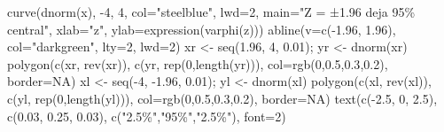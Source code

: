 \documentclass[
  letterpaper,
  DIV=11,
  numbers=noendperiod]{scrartcl}
\newenvironment{Shaded}{\begin{snugshade}}{\end{snugshade}}
\newcommand{\AttributeTok}[1]{\textcolor[rgb]{0.40,0.45,0.13}{#1}}
\newcommand{\ConstantTok}[1]{\textcolor[rgb]{0.56,0.35,0.01}{#1}}
\newcommand{\DecValTok}[1]{\textcolor[rgb]{0.68,0.00,0.00}{#1}}
\newcommand{\FloatTok}[1]{\textcolor[rgb]{0.68,0.00,0.00}{#1}}
\newcommand{\FunctionTok}[1]{\textcolor[rgb]{0.28,0.35,0.67}{#1}}
\newcommand{\NormalTok}[1]{\textcolor[rgb]{0.00,0.23,0.31}{#1}}
\newcommand{\OtherTok}[1]{\textcolor[rgb]{0.00,0.23,0.31}{#1}}
\newcommand{\SpecialCharTok}[1]{\textcolor[rgb]{0.37,0.37,0.37}{#1}}
\newcommand{\StringTok}[1]{\textcolor[rgb]{0.13,0.47,0.30}{#1}}
\begin{document}
\begin{Shaded}
\begin{Highlighting}[]
\FunctionTok{curve}\NormalTok{(}\FunctionTok{dnorm}\NormalTok{(x), }\SpecialCharTok{{-}}\DecValTok{4}\NormalTok{, }\DecValTok{4}\NormalTok{, }\AttributeTok{col=}\StringTok{"steelblue"}\NormalTok{, }\AttributeTok{lwd=}\DecValTok{2}\NormalTok{,}
      \AttributeTok{main=}\StringTok{"Z = ±1.96 deja 95\% central"}\NormalTok{,}
      \AttributeTok{xlab=}\StringTok{"z"}\NormalTok{, }\AttributeTok{ylab=}\FunctionTok{expression}\NormalTok{(}\FunctionTok{varphi}\NormalTok{(z)))}
\FunctionTok{abline}\NormalTok{(}\AttributeTok{v=}\FunctionTok{c}\NormalTok{(}\SpecialCharTok{{-}}\FloatTok{1.96}\NormalTok{, }\FloatTok{1.96}\NormalTok{), }\AttributeTok{col=}\StringTok{"darkgreen"}\NormalTok{, }\AttributeTok{lty=}\DecValTok{2}\NormalTok{, }\AttributeTok{lwd=}\DecValTok{2}\NormalTok{)}
\NormalTok{xr }\OtherTok{\textless{}{-}} \FunctionTok{seq}\NormalTok{(}\FloatTok{1.96}\NormalTok{, }\DecValTok{4}\NormalTok{, }\FloatTok{0.01}\NormalTok{); yr }\OtherTok{\textless{}{-}} \FunctionTok{dnorm}\NormalTok{(xr)}
\FunctionTok{polygon}\NormalTok{(}\FunctionTok{c}\NormalTok{(xr, }\FunctionTok{rev}\NormalTok{(xr)), }\FunctionTok{c}\NormalTok{(yr, }\FunctionTok{rep}\NormalTok{(}\DecValTok{0}\NormalTok{,}\FunctionTok{length}\NormalTok{(yr))), }\AttributeTok{col=}\FunctionTok{rgb}\NormalTok{(}\DecValTok{0}\NormalTok{,}\FloatTok{0.5}\NormalTok{,}\FloatTok{0.3}\NormalTok{,}\FloatTok{0.2}\NormalTok{), }\AttributeTok{border=}\ConstantTok{NA}\NormalTok{)}
\NormalTok{xl }\OtherTok{\textless{}{-}} \FunctionTok{seq}\NormalTok{(}\SpecialCharTok{{-}}\DecValTok{4}\NormalTok{, }\SpecialCharTok{{-}}\FloatTok{1.96}\NormalTok{, }\FloatTok{0.01}\NormalTok{); yl }\OtherTok{\textless{}{-}} \FunctionTok{dnorm}\NormalTok{(xl)}
\FunctionTok{polygon}\NormalTok{(}\FunctionTok{c}\NormalTok{(xl, }\FunctionTok{rev}\NormalTok{(xl)), }\FunctionTok{c}\NormalTok{(yl, }\FunctionTok{rep}\NormalTok{(}\DecValTok{0}\NormalTok{,}\FunctionTok{length}\NormalTok{(yl))), }\AttributeTok{col=}\FunctionTok{rgb}\NormalTok{(}\DecValTok{0}\NormalTok{,}\FloatTok{0.5}\NormalTok{,}\FloatTok{0.3}\NormalTok{,}\FloatTok{0.2}\NormalTok{), }\AttributeTok{border=}\ConstantTok{NA}\NormalTok{)}
\FunctionTok{text}\NormalTok{(}\FunctionTok{c}\NormalTok{(}\SpecialCharTok{{-}}\FloatTok{2.5}\NormalTok{, }\DecValTok{0}\NormalTok{, }\FloatTok{2.5}\NormalTok{), }\FunctionTok{c}\NormalTok{(}\FloatTok{0.03}\NormalTok{, }\FloatTok{0.25}\NormalTok{, }\FloatTok{0.03}\NormalTok{), }\FunctionTok{c}\NormalTok{(}\StringTok{"2.5\%"}\NormalTok{,}\StringTok{"95\%"}\NormalTok{,}\StringTok{"2.5\%"}\NormalTok{), }\AttributeTok{font=}\DecValTok{2}\NormalTok{)}
\end{Highlighting}
\end{Shaded}
\end{document}
